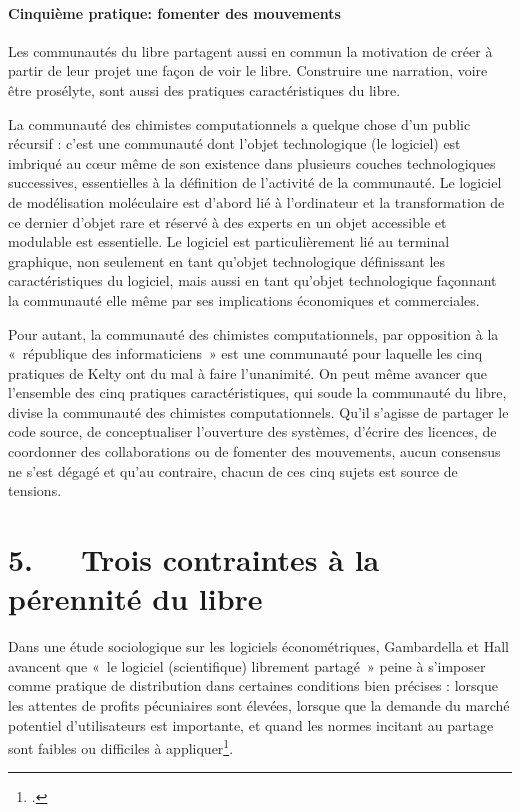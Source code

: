 \documentclass{FramateX}
\begin{document}
\begin{refsection}
\paragraph{Cinquième pratique: fomenter des mouvements}
Les communautés du libre partagent aussi en commun la motivation de
créer à partir de leur projet une façon de voir le libre. Construire
une narration, voire être prosélyte, sont aussi des pratiques
caractéristiques du libre.

\bigskip

La communauté des chimistes computationnels a quelque chose
d'un public récursif : c'est une
communauté dont l'objet technologique (le logiciel)
est imbriqué au cœur même de son existence dans plusieurs couches
technologiques successives, essentielles à la définition de
l'activité de la communauté. Le logiciel de
modélisation moléculaire est d'abord lié à
l'ordinateur et la transformation de ce dernier
d'objet rare et réservé à des experts en un objet
accessible et modulable est essentielle. Le logiciel est
particulièrement lié au terminal graphique, non seulement en tant
qu'objet technologique définissant les
caractéristiques du logiciel, mais aussi en tant
qu'objet technologique façonnant la communauté elle
même par ses implications économiques et commerciales.

Pour autant, la communauté des chimistes computationnels, par opposition
à la «~république des informaticiens~» est une communauté pour laquelle
les cinq pratiques de Kelty ont du mal à faire
l'unanimité. On peut même avancer que
l'ensemble des cinq pratiques caractéristiques, qui
soude la communauté du libre, divise la communauté des chimistes
computationnels. Qu'il s'agisse de
partager le code source, de conceptualiser l'ouverture
des systèmes, d'écrire des licences, de coordonner des
collaborations ou de fomenter des mouvements, aucun consensus ne
s'est dégagé et qu'au contraire,
chacun de ces cinq sujets est source de tensions.

\section*{5.~~~Trois contraintes à la pérennité du libre}
{}


Dans une étude sociologique sur les logiciels économétriques,
Gambardella et Hall avancent que «~le logiciel (scientifique) librement
partagé~» peine à s'imposer comme pratique de
distribution dans certaines conditions bien précises : lorsque les
attentes de profits pécuniaires sont élevées, lorsque que la demande du
marché potentiel d'utilisateurs est importante, et
quand les normes incitant au partage sont faibles ou difficiles à
appliquer\footnote{\cite{Gambardella2006}.}.


\end{refsection}
\end{document}
